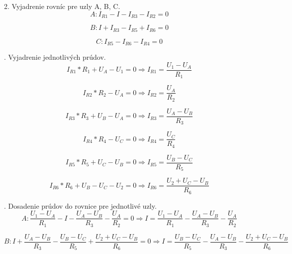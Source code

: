 \documentclass[a4paper,12pt]{article}
\begin{document}
2. Vyjadrenie rovníc pre uzly A, B, C.
\begin{equation}
A: I_{R1} - I - I_{R3} - I_{R2} = 0
\end{equation}

\begin{equation}
B: I + I_{R3} - I_{R5} + I_{R6} = 0
\end{equation}

\begin{equation}
C: I_{R5} - I_{R6} - I_{R4} = 0
\end{equation}

. Vyjadrenie jednotlivých prúdov.
\begin{equation}
I_{R1} * R_1 + U_A - U_1 = 0 \Rightarrow I_{R1} = \frac{U_1 - U_A}{R_1}
\end{equation}

\begin{equation}
I_{R2} * R_2 - U_A = 0 \Rightarrow I_{R2} = \frac{U_A}{R_2}
\end{equation}

\begin{equation}
I_{R3} * R_3 + U_B - U_A = 0 \Rightarrow I_{R3} = \frac{U_A - U_B}{R_3}
\end{equation}

\begin{equation}
I_{R4} * R_4 - U_C = 0 \Rightarrow I_{R4} = \frac{U_C}{R_4}
\end{equation}

\begin{equation}
I_{R5} * R_5 + U_C - U_B = 0 \Rightarrow I_{R5} = \frac{U_B - U_C}{R_5}
\end{equation}

\begin{equation}
I_{R6} * R_6 + U_B - U_C - U_2 = 0 \Rightarrow I_{R6} = \frac{U_2 + U_C - U_B}{R_6}
\end{equation}


. Dosadenie prúdov do rovnice pre jednotlivé uzly.
\begin{equation}
A: \frac{U_1 - U_A}{R_1} - I - \frac{U_A - U_B}{R_3} - \frac{U_A}{R_2} = 0 \Rightarrow
I = \frac{U_1 - U_A}{R_1} - \frac{U_A - U_B}{R_3} - \frac{U_A}{R_2}
\end{equation}

\begin{equation}
B: I + \frac{U_A - U_B}{R_3} - \frac{U_B - U_C}{R_5} + \frac{U_2 + U_C - U_B}{R_6} = 0  \Rightarrow
I = \frac{U_B - U_C}{R_5} - \frac{U_A - U_B}{R_3} - \frac{U_2 + U_C - U_B}{R_6}
\end{equation}
\end{document}
